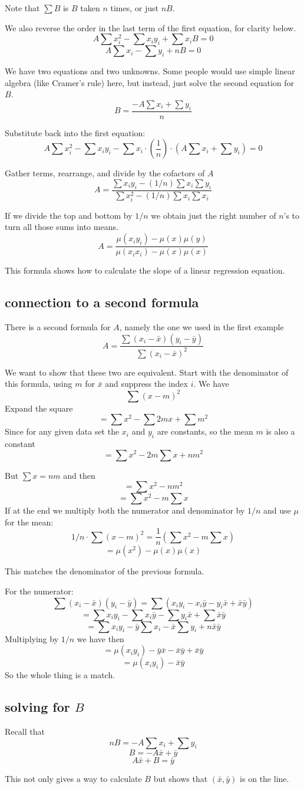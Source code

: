 \documentclass[11pt, oneside]{article}
\begin{document}
Note that $\sum B$ is $B$ taken $n$ times, or just $nB$.  

We also reverse the order in the last term of the first equation, for clarity below.
\[ A \sum x_i^2 -  \sum x_i y_i + \sum x_i B = 0 \]
\[ A \sum x_i -  \sum y_i + nB = 0 \]

We have two equations and two unknowns.  Some people would use simple linear algebra (like Cramer's rule) here, but instead, just solve the second equation for $B$.
\[ B = \frac{- A \sum x_i +  \sum y_i}{n} \]

Substitute back into the first equation:
\[ A \sum x_i^2 -  \sum x_i y_i - \sum x_i \cdot (\frac{1}{n}) \cdot ( A \sum x_i +  \sum y_i) = 0 \]

Gather terms, rearrange, and divide by the cofactors of $A$
\[ A = \frac{\sum x_i y_i - (1/n) \sum x_i \sum y_i}{\sum x_i^2 - (1/n) \sum x_i \sum x_i } \]

If we divide the top and bottom by $1/n$ we obtain just the right number of $n$'s to turn all those sums into means.
\[ A = \frac{\mu(x_i y_i) - \mu(x) \mu(y)}{\mu(x_i x_i) - \mu(x)  \mu(x)} \]

This formula shows how to calculate the slope of a linear regression equation.

\subsection*{connection to a second formula}

There is a second formula for $A$, namely the one we used in the first example
\[ A = \frac{\sum (x_i - \bar{x})(y_i - \bar{y})}{\sum (x_i -\bar{x})^2 } \]

We want to show that these two are equivalent.  Start with the denominator of this formula, using $m$ for $\bar{x}$ and suppress the index $i$.  We have
\[ \sum (x - m)^2 \]
Expand the square
\[ = \sum x^2 - \sum 2mx + \sum m^2 \]
Since for any given data set the $x_i$ and $y_i$ are constants, so the mean $m$ is also a constant
\[ = \sum x^2 - 2m \sum x + nm^2 \]

But $\sum x = nm$ and then
\[ = \sum x^2 - nm^2 \]
\[ = \sum x^2 - m \sum x \]
If at the end we multiply both the numerator and denominator by $1/n$ and use $\mu$ for the mean:
\[ 1/n \cdot  \sum (x - m)^2 = \frac{1}{n} ( \sum x^2 - m \sum x) \]
\[ = \mu(x^2) - \mu(x) \mu(x) \]

This matches the denominator of the previous formula.  

For the numerator:
\[ \sum (x_i - \bar{x})(y_i - \bar{y}) = \sum (x_i y_i - x_i \bar{y} - y_i \bar{x} + \bar{x} \bar{y} ) \]
\[ = \sum x_i y_i - \sum x_i \bar{y} - \sum y_i \bar{x} + \sum \bar{x} \bar{y} \]
\[ = \sum x_i y_i - \bar{y} \sum x_i - \bar{x} \sum y_i  + n \bar{x} \bar{y} \]
Multiplying by $1/n$ we have then
\[ = \mu(x_i y_i) - \bar{y} \bar{x} - \bar{x} \bar{y} + \bar{x} \bar{y} \]
\[ = \mu(x_i y_i) - \bar{x} \bar{y} \]
So the whole thing is a match.

\subsection*{solving for $B$}
Recall that 
\[ nB = - A \sum x_i +  \sum y_i \]
\[ B = - A \bar{x} + \bar{y} \]
\[ A \bar{x} + B = \bar{y} \]

This not only gives a way to calculate $B$ but shows that $(\bar{x}, \bar{y})$ is on the line.
\end{document}

